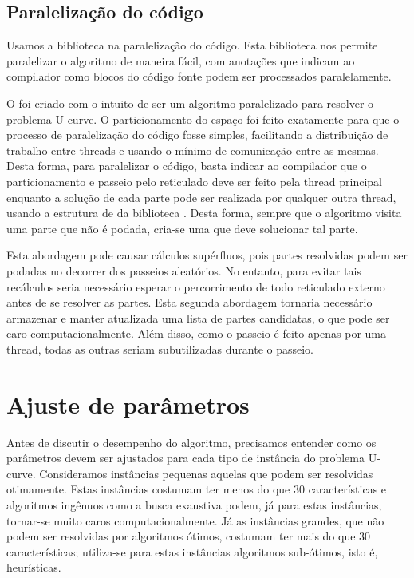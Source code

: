 \subsection{Paralelização do código}
Usamos a biblioteca  na paralelização do código.
Esta biblioteca nos permite paralelizar o algoritmo de maneira fácil,
com anotações que indicam ao compilador como blocos do código fonte 
podem ser processados paralelamente.

O  foi criado com o intuito de ser um algoritmo paralelizado
para resolver o problema U-curve. O particionamento do espaço foi feito
exatamente para que o processo de paralelização do código fosse simples,
facilitando a distribuição de trabalho entre threads e usando o mínimo
de comunicação entre as mesmas. Desta forma, para paralelizar o código,
basta indicar ao compilador que o particionamento e passeio pelo 
reticulado deve ser feito pela thread principal enquanto a solução de 
cada parte pode ser realizada por qualquer outra thread, usando a
estrutura de  da biblioteca . 
Desta forma, sempre que o algoritmo visita uma parte que não é podada, 
cria-se uma  que deve solucionar tal parte. 

Esta abordagem pode causar cálculos supérfluos, pois partes resolvidas
podem ser podadas no decorrer dos passeios aleatórios. No entanto, para 
evitar tais recálculos seria necessário esperar o percorrimento de todo
reticulado externo antes de se resolver as partes. Esta segunda 
abordagem tornaria necessário armazenar e manter atualizada uma lista de 
partes candidatas, o que pode ser caro computacionalmente. Além disso, 
como o passeio é feito apenas por uma thread, todas as outras seriam
subutilizadas durante o passeio. 


\section{Ajuste de parâmetros}
\label{sec:pucs:parameters}
Antes de discutir o desempenho do algoritmo, precisamos entender como
os parâmetros devem ser ajustados para cada tipo de instância do 
problema U-curve. Consideramos instâncias pequenas aquelas que podem ser
resolvidas otimamente. Estas instâncias costumam ter menos do que 30 
características e algoritmos ingênuos como a busca exaustiva podem, 
já para estas instâncias, tornar-se muito caros computacionalmente. Já 
as instâncias grandes, que não podem ser resolvidas por algoritmos 
ótimos, costumam ter mais do que 30 características; utiliza-se para 
estas instâncias algoritmos sub-ótimos, isto é, heurísticas.

